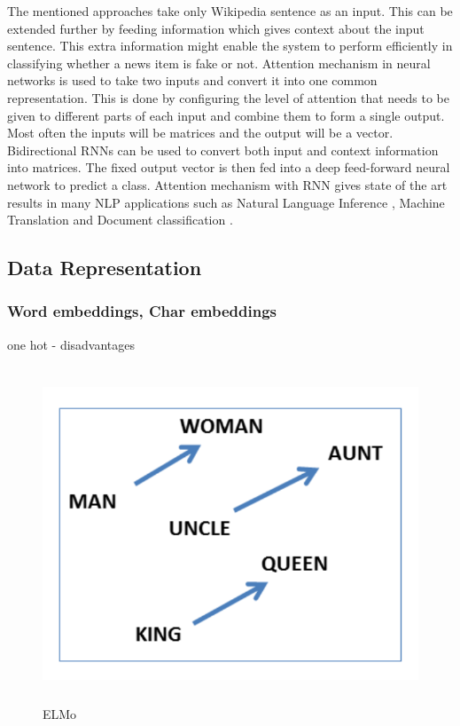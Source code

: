 \documentclass[a4paper, 11pt]{article}
\begin{document}
The mentioned approaches take only Wikipedia sentence as an input. This can be extended further by feeding information which gives context about the input sentence. This extra information might enable the system to perform efficiently in classifying whether a news item is fake or not. Attention mechanism in neural networks is used to take two inputs and convert it into one common representation. This is done by configuring the level of attention that needs to be given to different parts of each input and combine them to form a single output. Most often the inputs will be matrices and the output will be a vector. Bidirectional RNNs can be used to convert both input and context information into matrices. The fixed output vector is then fed into a deep feed-forward neural network to predict a class. Attention mechanism with RNN gives state of the art results in many NLP applications such as Natural Language Inference \parencite{Parikh2016}, Machine Translation \parencite{Bahdanau2014} and Document classification \parencite{Yang2016}.

\subsection{Data Representation}

\subsubsection{Word embeddings, Char embeddings}

one hot - disadvantages

\begin{figure}[htpb]
    \centering
    \includegraphics[width=\textwidth,height=10cm,keepaspectratio=true]
    {word2vec-gender-relation.png}
    \caption{
        ELMo
    }
    \label{fig:ELMO}
\end{figure}
\end{document}
